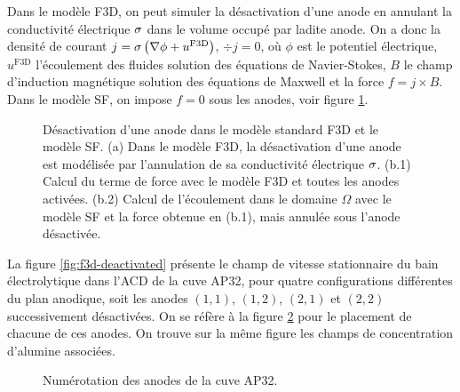 Dans le modèle F3D, on peut simuler la désactivation d'une anode en
annulant la conductivité électrique $\sigma$ dans le volume
occupé par ladite anode. On a donc la densité de courant $j =
\sigma\left( \nabla \phi + u^\mathrm{F3D} \right)$, $\div j = 0$,
où $\phi$ est le potentiel électrique, $u^\mathrm{F3D}$
l'écoulement des fluides solution des équations de Navier-Stokes,
$B$ le champ d'induction magnétique solution des équations de
Maxwell et la force $f = j\times B$. Dans le modèle SF, on impose
$f = 0$ sous les anodes, voir figure \ref{fig:anode-deactivation}.

\begin{figure}[t]
  \begin{center}
    
    \caption{Désactivation d'une anode dans le modèle standard F3D et
      le modèle SF. (a) Dans le modèle F3D, la désactivation d'une
      anode est modélisée par l'annulation de sa conductivité
      électrique $\sigma$. (b.1) Calcul du terme de force avec
      le modèle F3D et toutes les anodes activées. (b.2) Calcul de
      l'écoulement dans le domaine $\Omega$ avec le modèle SF et la
      force obtenue en (b.1), mais annulée sous l'anode désactivée.}
    \label{fig:anode-deactivation}
  \end{center}
\end{figure}
La figure \ref{fig:f3d-deactivated} présente
le champ de vitesse stationnaire du bain électrolytique dans l'ACD de
la cuve AP32, pour quatre configurations différentes du plan
anodique, soit les anodes $(1,1)$, $(1,2)$, $(2,1)$ et $(2,2)$
successivement désactivées. On se réfère à la figure
\ref{fig:anode-numerotations} pour le placement de chacune de ces anodes. On
trouve sur la même figure les champs de concentration d'alumine
associées.

\begin{figure}[t]
  \begin{center}
    
    \caption{Numérotation des anodes de la cuve AP32.}
    \label{fig:anode-numerotations}
  \end{center}
\end{figure}

